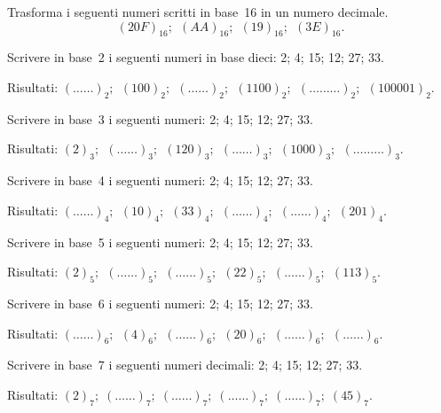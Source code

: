 \begin{esercizio}[\Ast]
\label{ese:4.5}
Trasforma i seguenti numeri scritti in base~16 in un numero decimale.
\[(20F)_{16};\:\:(AA)_{16};\:\:(19)_{16};\:\:(3E)_{16}.\]
\end{esercizio}


\begin{esercizio}
\label{ese:4.6}
Scrivere in base~2 i seguenti numeri in base dieci: 2; 4; 15; 12; 27; 33.

Risultati:
$(\ldots\ldots)_{2};\:\:(100)_{2};\:\:(\ldots\ldots)_{2};\:\:(1100)_{2};\:\:(\ldots\ldots\ldots)_{2};\:\:(100001)_{2}$.
\end{esercizio}

\begin{esercizio}
\label{ese:4.7}
Scrivere in base~3 i seguenti numeri: 2; 4; 15; 12; 27; 33.

Risultati:
$(2)_{3};\:\:(\ldots\ldots)_{3};\:\:(120)_{3};\:\:(\ldots\ldots)_{3};\:\:(1000)_{3};\:\:(\ldots\ldots\ldots)_{3}$.
\end{esercizio}

\begin{esercizio}
\label{ese:4.8}
Scrivere in base~4 i seguenti numeri: 2; 4; 15; 12; 27; 33.

Risultati:
$(\ldots\ldots)_{4};\:\:(10)_{4};\:\:(33)_{4};\:\:(\ldots\ldots)_{4};\:\:(\ldots\ldots)_{4};\:\:(201)_{4}$.
\end{esercizio}

\begin{esercizio}
\label{ese:4.9}
Scrivere in base~5 i seguenti numeri: 2; 4; 15; 12; 27; 33.

Risultati:
$(2)_{5};\:\:(\ldots\ldots)_{5};\:\:(\ldots\ldots)_{5};\:\:(22)_{5};\:\:(\ldots\ldots)_{5};\:\:(113)_{5}$.
\end{esercizio}

\begin{esercizio}
\label{ese:4.10}
Scrivere in base~6 i seguenti numeri: 2; 4; 15; 12; 27; 33.

Risultati:
$(\ldots\ldots)_{6};\:\:(4)_{6};\:\:(\ldots\ldots)_{6};\:\:(20)_{6};\:\:(\ldots\ldots)_{6};\:\:(\ldots\ldots)_{6}$.
\end{esercizio}

\begin{esercizio}
\label{ese:4.11}
Scrivere in base~7 i seguenti numeri decimali: 2; 4; 15; 12; 27; 33.

Risultati:
$(2)_{7};\;(\ldots\ldots)_{7};\;(\ldots\ldots)_{7};\;(\ldots\ldots)_{7};\;(\ldots\ldots)_{7};\;(45)_{7}$.
\end{esercizio}

